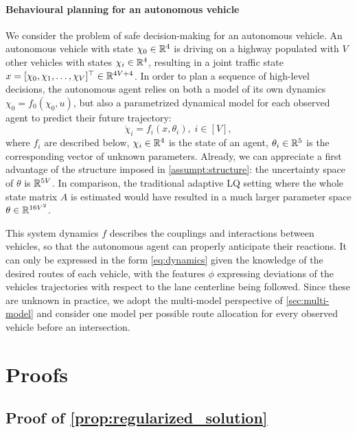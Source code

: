 \documentclass{article}
\begin{document}
\paragraph{Behavioural planning for an autonomous vehicle}
We consider the problem of safe decision-making for an autonomous vehicle. An autonomous vehicle with state $\chi_0\in\mathbb{R}^4$ is driving on a highway populated with $V$ other vehicles with states $\chi_i\in\mathbb{R}^4$, resulting in a joint traffic state $x = [\chi_0, \chi_1,\dots,\chi_V]^\top\in\mathbb{R}^{4V+4}$. In order to plan a sequence of high-level decisions, the autonomous agent relies on both a model of its own dynamics $\chi_0 = f_0(\chi_0,u)$, but also a parametrized dynamical model for each observed agent to predict their future trajectory: \[\dot{\chi}_i=f_i(x,\theta_i),\;i\in[V],\] where $f_i$ are described below, $\chi_i\in\mathbb{R}^4$ is the state of an agent, $\theta_i\in\mathbb{R}^5$ is the corresponding vector of unknown parameters. Already, we can appreciate a first advantage of the structure imposed in \autoref{assumpt:structure}: the uncertainty space of $\theta$ is $\mathbb{R}^{5V}$. In comparison, the traditional adaptive LQ setting where the whole state matrix $A$ is estimated would have resulted in a much larger parameter space $\theta\in\mathbb{R}^{16V^2}$.

This system dynamics $f$ describes the couplings and interactions between vehicles, so that the autonomous agent can properly anticipate their reactions. It can only be expressed in the form \eqref{eq:dynamics} given the knowledge of the desired routes of each vehicle, with the features $\phi$ expressing deviations of the vehicles trajectories with respect to the lane centerline being followed. Since these are unknown in practice, we adopt the multi-model perspective of \autoref{sec:multi-model} and consider one model per possible route allocation for every observed vehicle before an intersection.





\clearpage
\appendix

\section{Proofs}

\subsection{Proof of \autoref{prop:regularized_solution}}
\end{document}
